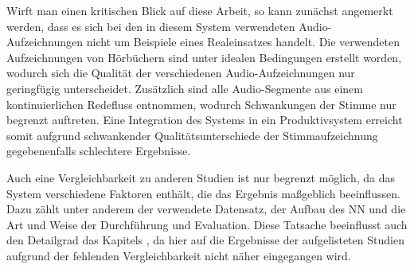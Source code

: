 Wirft man einen kritischen Blick auf diese Arbeit, so kann zunächst angemerkt werden, dass es sich bei den in diesem System verwendeten Audio-Aufzeichnungen nicht um Beispiele eines Realeinsatzes handelt.
Die verwendeten Aufzeichnungen von Hörbüchern sind unter idealen Bedingungen erstellt worden, wodurch sich die Qualität der verschiedenen Audio-Aufzeichnungen nur geringfügig unterscheidet.
Zusätzlich sind alle Audio-Segmente aus einem kontinuierlichen Redefluss entnommen, wodurch Schwankungen der Stimme nur begrenzt auftreten.
Eine Integration des Systems in ein Produktivsystem erreicht somit aufgrund schwankender Qualitätsunterschiede der Stimmaufzeichnung gegebenenfalls schlechtere Ergebnisse.

Auch eine Vergleichbarkeit zu anderen Studien ist nur begrenzt möglich, da das System verschiedene Faktoren enthält, die das Ergebnis maßgeblich beeinflussen.
Dazu zählt unter anderem der verwendete Datensatz, der Aufbau des \ac{NN} und die Art und Weise der Durchführung und Evaluation.
Diese Tatsache beeinflusst auch den Detailgrad das Kapitels , da hier auf die Ergebnisse der aufgelisteten Studien aufgrund der fehlenden Vergleichbarkeit nicht näher eingegangen wird.



